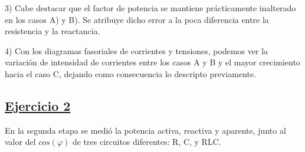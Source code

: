 \documentclass[a4paper]{article}
\begin{document}
3) Cabe destacar que el factor de potencia se mantiene prácticamente inalterado en los casos A) y B). Se atribuye dicho error a la poca diferencia entre la resistencia y la reactancia.

4) Con los diagramas fasoriales de corrientes y tensiones, podemos ver la variación de intensidad de corrientes entre los casos A y B y el mayor crecimiento hacia el caso C, dejando como consecuencia lo descripto previamente.

\subsection*{\underline{Ejercicio 2}}

En la segunda etapa se medió la potencia activa, reactiva y aparente, junto al valor del $cos(\varphi)$ de tres circuitos diferentes: R, C, y RLC.
\end{document}
